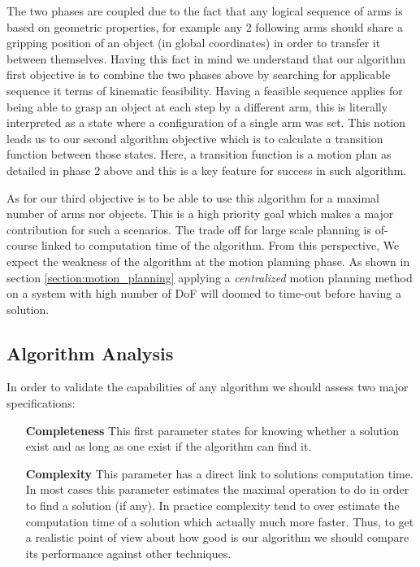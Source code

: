 The two phases are coupled due to the fact that any logical sequence of arms is based on geometric properties, for example any 2 following arms should share a gripping position of an object (in global coordinates) in order to transfer it between themselves. Having this fact in mind we understand that our algorithm first objective is to combine the two phases above by searching for applicable sequence it terms of kinematic feasibility. 
Having a feasible sequence applies for being able to grasp an object at each step by a different arm, this is literally interpreted as a state where a configuration of a single arm was set. This notion leads us to our second algorithm objective which is to calculate a transition function between those states. Here, a transition function is a motion plan as detailed in phase 2 above and this is a key feature for success in such algorithm.


As for our third objective is to be able to use this algorithm for a maximal number of arms nor objects. This is a high priority goal which makes a major contribution for such a scenarios. The trade off for large scale planning is of-course linked to computation time of the algorithm. From this perspective, We expect the weakness of the algorithm at the motion planning phase. As shown in section \ref{section:motion_planning} applying a \textit{centralized} motion planning method on a system with high number of DoF will doomed to time-out before having a solution.  


\subsection{Algorithm Analysis}
In order to validate the capabilities of any algorithm we should assess two major specifications:

\begin{enumerate}

\item[\textbf{Completeness}] This first parameter states for knowing whether a solution exist and as long as one exist if the algorithm can find it.

\item[\textbf{Complexity}] This parameter has a direct link to solutions computation time. In most cases this parameter estimates the maximal operation to do in order to find a solution (if any). In practice complexity tend to over estimate the computation time of a solution which actually much more faster. Thus, to get a realistic point of view about how good is our algorithm we should compare its performance against other techniques.


\end{enumerate}




